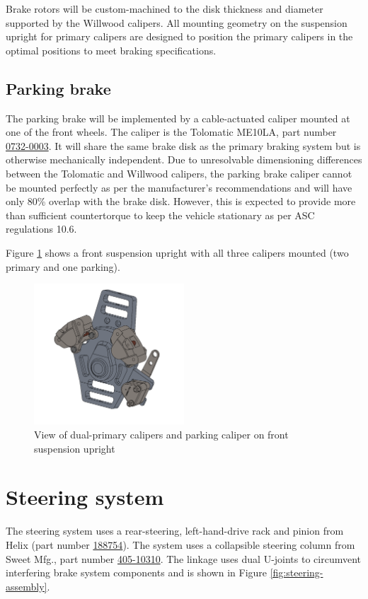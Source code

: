 \documentclass[10pt]{article}
\begin{document}
Brake rotors will be custom-machined to the disk thickness and diameter supported by the Willwood calipers. All mounting geometry on the suspension upright for primary calipers are designed to position the primary calipers in the optimal positions to meet braking specifications.

\subsection{Parking brake}
The parking brake will be implemented by a cable-actuated caliper mounted at one of the front wheels. The caliper is the Tolomatic ME10LA, part number \href{https://www.tolomatic.com/products/product-details/me10-mechanical-disc-brake#/specs-order}{0732-0003}. It will share the same brake disk as the primary braking system but is otherwise mechanically independent. Due to unresolvable dimensioning differences between the Tolomatic and Willwood calipers, the parking brake caliper cannot be mounted perfectly as per the manufacturer's recommendations and will have only 80\% overlap with the brake disk. However, this is expected to provide more than sufficient countertorque to keep the vehicle stationary as per ASC regulations 10.6.

Figure \ref{fig:calipers-mounting-geometry} shows a front suspension upright with all three calipers mounted (two primary and one parking).

\begin{figure}
\centering
\includegraphics[width=0.5\textwidth]{figures/caliper-mounting-geometry}
\caption{View of dual-primary calipers and parking caliper on front suspension upright }
\label{fig:calipers-mounting-geometry}
\end{figure}

\section{Steering system}
The steering system uses a rear-steering, left-hand-drive rack and pinion from Helix (part number \href{http://www.helixsuspension.com/catalog/Steering/Manual-Steering-Racks/HEXSR5/Omni-Manual-Steering-Rack---Rear-Steering}{188754}). The system uses a collapsible steering column from Sweet Mfg.\@, part number \href{https://sweetmfg.biz/product.php?productid=2836}{405-10310}. The linkage uses dual U-joints to circumvent interfering brake system components and is shown in Figure \ref{fig:steering-assembly}.
\end{document}
